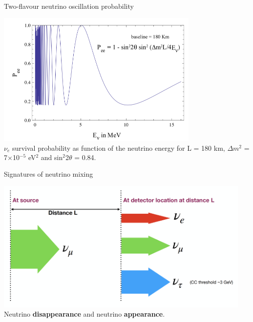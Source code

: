%
%
%

\begin{frame}{Two-flavour neutrino oscillation probability}

  \begin{center}
    \includegraphics[width=0.75\textwidth]{./images/osc101/Pee_2flavour_pdg}\\
    \vspace{0.4cm}
    $\nu_{e}$ survival probability as function of the neutrino energy for L = 180 km,
    $\Delta m^{2}$ = 7$\times$10$^{-5}$ eV$^{2}$ and sin$^2$2$\theta$ = 0.84.
  \end{center}

\end{frame}

%
%
%

\begin{frame}{Signatures of neutrino mixing}

  \begin{center}
    \includegraphics[width=0.95\textwidth]{./images/osc101/oscillation_signatures}\\
    \vspace{0.4cm}
    Neutrino {\bf \color{blue} disappearance} and neutrino {\bf \color{red} appearance}.
  \end{center}

\end{frame}

